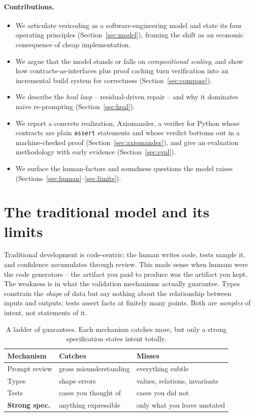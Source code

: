 \documentclass[sigconf,nonacm]{acmart}
\newcommand{\code}[1]{\texttt{#1}}
\begin{document}
\paragraph{Contributions.}
\begin{itemize}
  \item We articulate vericoding as a software-engineering model and state its
  four operating principles (Section~\ref{sec:model}), framing the shift as an
  economic consequence of cheap implementation.
  \item We argue that the model stands or falls on \emph{compositional scaling},
  and show how contracts-as-interfaces plus proof caching turn verification into
  an incremental build system for correctness (Section~\ref{sec:compose}).
  \item We describe the \emph{heal loop} -- residual-driven repair -- and why it
  dominates naive re-prompting (Section~\ref{sec:heal}).
  \item We report a concrete realization, Axiomander, a verifier for Python whose
  contracts are plain \code{assert} statements and whose verdict bottoms out in a
  machine-checked proof (Section~\ref{sec:axiomander}), and give an evaluation
  methodology with early evidence (Section~\ref{sec:eval}).
  \item We surface the human-factors and soundness questions the model raises
  (Sections~\ref{sec:human}--\ref{sec:limits}).
\end{itemize}

\section{The traditional model and its limits}
\label{sec:traditional}

Traditional development is code-centric: the human writes code, tests sample it,
and confidence accumulates through review. This made sense when humans were the
code generators -- the artifact you paid to produce was the artifact you kept.
The weakness is in what the validation mechanisms actually guarantee. Types
constrain the \emph{shape} of data but say nothing about the relationship between
inputs and outputs; tests assert facts at finitely many points. Both are
\emph{samples} of intent, not statements of it.

\begin{table}[t]
\caption{A ladder of guarantees. Each mechanism catches more, but only a strong
specification states intent totally.}
\label{tab:ladder}
\small
\begin{tabular}{@{}lll@{}}
\toprule
Mechanism & Catches & Misses \\
\midrule
Prompt review & gross misunderstanding & everything subtle \\
Types & shape errors & values, relations, invariants \\
Tests & cases you thought of & cases you did not \\
\textbf{Strong spec.} & anything expressible & only what you leave unstated \\
\bottomrule
\end{tabular}
\end{table}
\end{document}
